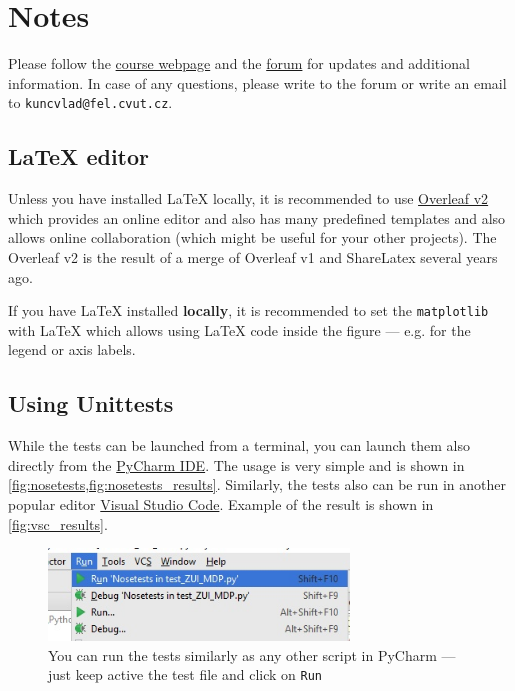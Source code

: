\documentclass[10pt,journal,compsoc,twoside]{IEEEtran}
\begin{document}
\appendices
\section{Notes}
Please follow the \href{http://cw.fel.cvut.cz/wiki/courses/b4b36zui/tasks/task5}{course webpage} and the \href{https://cw.felk.cvut.cz/forum/thread-4927.html}{forum} for updates and additional information. In case of any questions, please write to the forum or write an email to \texttt{kuncvlad@fel.cvut.cz}.
\subsection{\LaTeX{} editor}
Unless you have installed \LaTeX{} locally, it is recommended to use \href{https://www.overleaf.com/?r=8e97ffd0&rm=d&rs=b}{Overleaf v2} which provides an online editor and also has many predefined templates and also allows online collaboration (which might be useful for your other projects). The Overleaf v2 is the result of a merge of Overleaf v1 and ShareLatex several years ago.

If you have \LaTeX{} installed \textbf{locally}, it is recommended to set the \texttt{matplotlib} with \LaTeX{} which allows using \LaTeX{} code inside the figure --- e.g. for the legend or axis labels.

\subsection{Using Unittests}
While the tests can be launched from a terminal, you can launch them also directly from the \href{https://www.jetbrains.com/pycharm/}{PyCharm IDE}. The usage is very simple and is shown in \cref{fig:nosetests,fig:nosetests_results}. Similarly, the tests also can be run in another popular editor \href{https://code.visualstudio.com/}{Visual Studio Code}. Example of the result is shown in \cref{fig:vsc_results}.

\begin{figure}[t]
    \includegraphics[width=8cm]{figures/pycharm_nosetests.jpg}
    \centering
    \caption{You can run the tests similarly as any other script in PyCharm --- just keep active the test file and click on \texttt{Run}}
    \label{fig:nosetests}
\end{figure}
\end{document}
